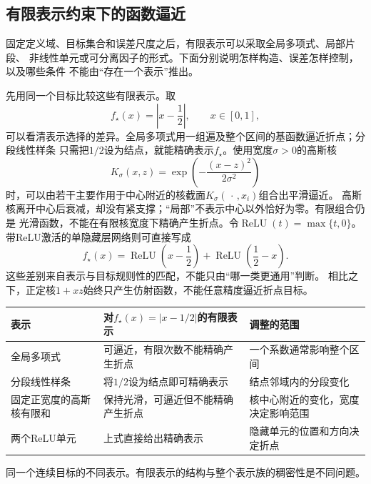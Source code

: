 \subsection{有限表示约束下的函数逼近}
\label{sec:functional-approximation-capacity-representation}

固定定义域、目标集合和误差尺度之后，有限表示可以采取全局多项式、局部片段、
非线性单元或可分离因子的形式。下面分别说明怎样构造、误差怎样控制，以及哪些条件
不能由“存在一个表示”推出。

先用同一个目标比较这些有限表示。取
\[
  f_\star(x)=\left|x-\frac12\right|,
  \qquad x\in[0,1],
\]
可以看清表示选择的差异。全局多项式用一组遍及整个区间的基函数逼近折点；分段线性样条
只需把$1/2$设为结点，就能精确表示$f_\star$。使用宽度$\sigma>0$的高斯核
\[
  K_\sigma(x,z)
  =
  \exp\left(-\frac{(x-z)^2}{2\sigma^2}\right)
\]
时，可以由若干主要作用于中心附近的核截面$K_\sigma(\,\cdot\,,x_i)$组合出平滑逼近。
高斯核离开中心后衰减，却没有紧支撑；“局部”不表示中心以外恰好为零。有限组合仍是
光滑函数，不能在有限核宽度下精确产生折点。令$\operatorname{ReLU}(t)=\max\{t,0\}$。带ReLU激活的单隐藏层网络则可直接写成
\[
  f_\star(x)
  =
  \operatorname{ReLU}\left(x-\frac12\right)
  +
  \operatorname{ReLU}\left(\frac12-x\right).
\]
这些差别来自表示与目标规则性的匹配，不能只由“哪一类更通用”判断。
相比之下，正定核$1+xz$始终只产生仿射函数，不能任意精度逼近折点目标。

\begin{fullwidth}
\begin{minipage}{\linewidth}
 \centering\small
 \begin{tabularx}{\linewidth}{@{}lXX@{}}
 \toprule
 表示 & 对$f_\star(x)=|x-1/2|$的有限表示 & 调整的范围\\
 \midrule
 全局多项式 & 可逼近，有限次数不能精确产生折点 & 一个系数通常影响整个区间\\
 分段线性样条 & 将$1/2$设为结点即可精确表示 & 结点邻域内的分段变化\\
 固定正宽度的高斯核有限和 & 保持光滑，可逼近但不能精确产生折点 & 核中心附近的变化，宽度决定影响范围\\
 两个ReLU单元 & 上式直接给出精确表示 & 隐藏单元的位置和方向决定折点\\
 \bottomrule
 \end{tabularx}
   {同一个连续目标的不同表示。有限表示的结构与整个表示族的稠密性是不同问题。}
\end{minipage}
\end{fullwidth}


